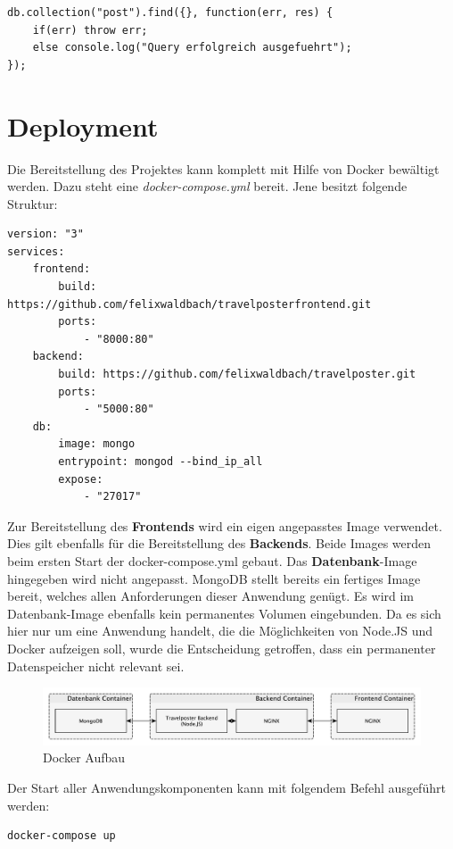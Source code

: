 \documentclass[12pt,a4paper]{report}
\begin{document}
\begin{verbatim}
db.collection("post").find({}, function(err, res) {
    if(err) throw err;
    else console.log("Query erfolgreich ausgefuehrt");
});
\end{verbatim}

\section{Deployment}
Die Bereitstellung des Projektes kann komplett mit Hilfe von Docker bewältigt werden. Dazu steht eine \textit{docker-compose.yml} bereit. Jene besitzt folgende Struktur:

\begin{verbatim}
version: "3"
services:
    frontend:
        build: https://github.com/felixwaldbach/travelposterfrontend.git
        ports:
            - "8000:80"
    backend:
        build: https://github.com/felixwaldbach/travelposter.git
        ports:
            - "5000:80"
    db:
        image: mongo
        entrypoint: mongod --bind_ip_all
        expose: 
            - "27017"
\end{verbatim}

Zur Bereitstellung des \textbf{Frontends} wird ein eigen angepasstes Image verwendet. Dies gilt ebenfalls für die Bereitstellung des \textbf{Backends}. Beide Images werden beim ersten Start der docker-compose.yml gebaut. Das \textbf{Datenbank}-Image hingegeben wird nicht angepasst. MongoDB stellt bereits ein fertiges Image bereit, welches allen Anforderungen dieser Anwendung genügt. Es wird im Datenbank-Image ebenfalls kein permanentes Volumen eingebunden. Da es sich hier nur um eine Anwendung handelt, die die Möglichkeiten von Node.JS und Docker aufzeigen soll, wurde die Entscheidung getroffen, dass ein permanenter Datenspeicher nicht relevant sei.

\begin{figure}[h]
	\centering
	\includegraphics[width=1\linewidth]{Bilder_Doku/docker}
	\caption[]{Docker Aufbau}
\end{figure}

Der Start aller Anwendungskomponenten kann mit folgendem Befehl ausgeführt werden:
\begin{verbatim}
docker-compose up
\end{verbatim}
\end{document}
